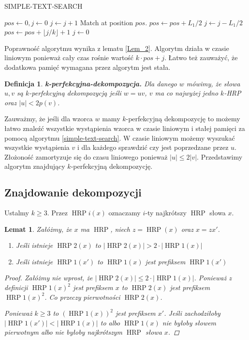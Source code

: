 \documentclass{article}
\newtheorem{definition}{Definicja}[section]
\newtheorem{lemma}{Lemat}[section]
\DeclareMathOperator{\HRP}{HRP}
\begin{document}
\begin{algorithm}[H]
\caption{SIMPLE-TEXT-SEARCH}
\label{simple-text-search}
\begin{algorithmic} 
\STATE $pos \gets 0, j \gets 0$
        \STATE $j \gets j + 1$
    \ENDWHILE
        \RETURN Match at position $pos$.
    \ENDIF
        \STATE $pos \gets pos + L_1 / 2$
        \STATE $j \gets j - L_1 / 2$
    \ELSE
        \STATE $pos \gets pos + \lfloor j / k \rfloor + 1$
        \STATE $j \gets 0$
    \ENDIF
\ENDWHILE
\end{algorithmic}
\end{algorithm}
Poprawność algorytmu wynika z lematu \ref{Lem_2}. Algorytm działa w czasie liniowym ponieważ cały czas rośnie wartość $k \cdot pos + j$. Łatwo też zauważyć, że dodatkowa pamięć wymagana przez algorytm jest stała.

\begin{definition}
\textbf{\textit{k-perfekcyjna-dekompozycja.}} Dla danego $w$ mówimy, że słowa $u,v$ są $k$-perfekcyjną dekompozycją jeśli $w = uv$, $v$ ma co najwyżej jedno $k$-HRP oraz $|u| < 2p(v)$.
\end{definition}

Zauważmy, że jeśli dla wzorca $w$ mamy $k$-perfekcyjną dekompozycję to możemy łatwo znaleźć wszystkie wystąpienia wzorca w czasie liniowym i stałej pamięci za pomocą algorytmu \ref{simple-text-search}. W czasie liniowym możemy wyszukać wszystkie wystąpienia $v$ i dla każdego sprawdzić czy jest poprzedzane przez $u$.
Złożoność zamortyzuje się do czasu liniowego ponieważ $|u| \leq 2|v|$.
Przedstawimy algorytm znajdujący $k$-perfekcyjną dekompozycję.

\subsection{Znajdowanie dekompozycji}

Ustalmy $k \geq 3$. Przez $\HRP i(x)$ oznaczamy $i$-ty najkrótszy $\HRP$ słowa $x$.
\begin{lemma}\label{Lem_3}
Załóżmy, że $x$ ma $\HRP$, niech $z=\HRP(x)$ oraz $x = zx'$.
\begin{enumerate}
    \item Jeśli istnieje $\HRP2(x)$ to $|\HRP2(x)| > 2\cdot |\HRP1(x)|$
    \item Jeśli istnieje $\HRP1(x')$ to $\HRP1(x)$ jest prefiksem $\HRP1(x')$
\end{enumerate}
\begin{proof}
Załóżmy nie wprost, że $|\HRP2(x)| \leq 2\cdot |\HRP1(x)|$. Ponieważ z definicji $\HRP1(x)^2$ jest prefiksem $x$ to $\HRP2(x)$ jest prefiksem $\HRP1(x)^2$. Co przeczy pierwotności $\HRP2(x)$.

Ponieważ $k \geq 3$ to $(\HRP1(x))^2$ jest prefiksem $x'$. Jeśli zachodziłoby $|\HRP1(x')| < |\HRP1(x)|$ to albo $\HRP1(x)$ nie byłoby słowem pierwotnym albo nie byłoby najkrótszym $\HRP$ słowa $x$.
\end{proof}
\end{lemma}
\end{document}
